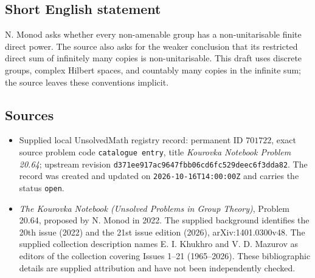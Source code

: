 \documentclass[11pt]{article}
\begin{document}
\subsection{Short English statement}
N. Monod asks whether every non-amenable group has a non-unitarisable finite direct power. The source also asks for the weaker conclusion that its restricted direct sum of infinitely many copies is non-unitarisable. This draft uses discrete groups, complex Hilbert spaces, and countably many copies in the infinite sum; the source leaves these conventions implicit.
\subsection{Sources}
\begin{itemize}
\item Supplied local UnsolvedMath registry record: permanent ID \(701722\), exact source problem code \texttt{catalogue entry}, title \emph{Kourovka Notebook Problem 20.64}; upstream revision \texttt{d371ee917ac9647fbb06cd6fc529deec6f3dda82}. The record was created and updated on \texttt{2026-10-16T14:00:00Z} and carries the status \texttt{open}.
\item \emph{The Kourovka Notebook (Unsolved Problems in Group Theory)}, Problem 20.64, proposed by N. Monod in 2022. The supplied background identifies the 20th issue (2022) and the 21st issue edition (2026), arXiv:1401.0300v48. The supplied collection description names E. I. Khukhro and V. D. Mazurov as editors of the collection covering Issues 1--21 (1965--2026). These bibliographic details are supplied attribution and have not been independently checked.
\end{itemize}
\end{document}
